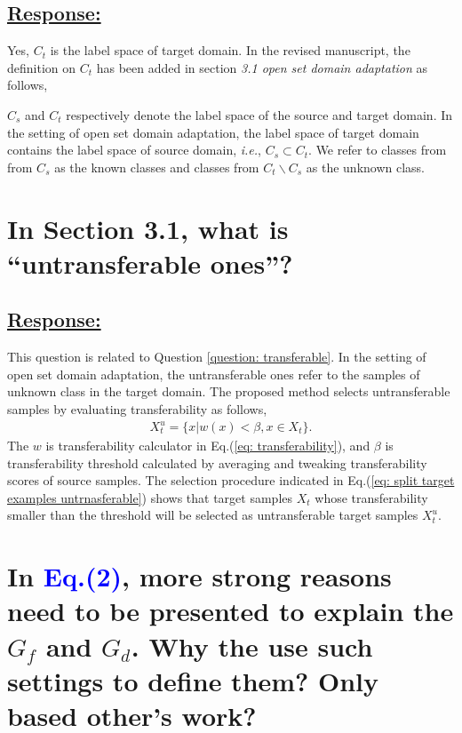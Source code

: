 \subsection*{\underline{\textbf{Response:}}}
Yes, $C_t$ is the label space of target domain.
In the revised manuscript, the definition on $C_t$ has been added in section \textit{3.1 open set domain adaptation} as follows,
\begin{siderules}
$C_s$ and $C_t$ respectively denote the label space of the source and target domain.
In the setting of open set domain adaptation, the label space of target domain contains the label space of source domain, \textit{i.e.}, $C_s \subset C_t$. 
We refer to classes from from $C_s$ as the known classes and classes from $C_t\backslash C_s$ as the unknown class.
\end{siderules}


\section{In Section 3.1, what is ``untransferable ones''?}
\subsection*{\underline{\textbf{Response:}}}

This question is related to Question \ref{question: transferable}.
In the setting of open set domain adaptation, the untransferable ones refer to the samples of unknown class in the target domain.
The proposed method selects untransferable samples by evaluating transferability as follows,
\begin{equation}
    \label{eq: split target examples untrnasferable}
    \begin{split}
        X_t^u=\{x|w(x) < \beta, x \in X_t \}.
    \end{split}
\end{equation}
The $w$ is transferability calculator in Eq.(\ref{eq: transferability}), and $\beta$ is transferability threshold calculated by averaging and tweaking transferability scores of source samples.
The selection procedure indicated in Eq.(\ref{eq: split target examples untrnasferable}) shows that target samples  $X_t$ whose transferability smaller than the threshold will be selected as untransferable target samples $X_t^u$. 

\section{In \textcolor{blue}{Eq.(2)}, more strong reasons need to be presented to explain the $G_f$ and $G_d$. Why the use such settings to define them? Only based other's work?}
